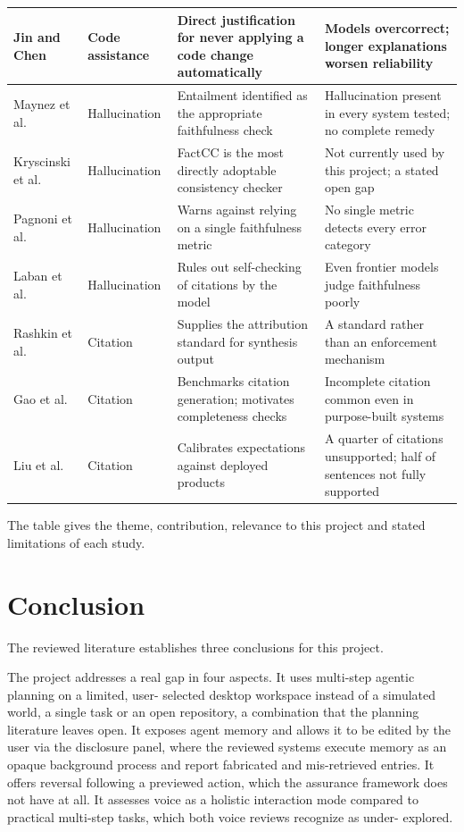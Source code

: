 \documentclass{FastFyp}
\begin{document}
{\begin{longtable}{|p{2.6cm}|p{2.0cm}|p{3.6cm}|p{4.6cm}|}
\hline
Jin and Chen \cite{ref:jin2026} & Code assistance & Direct justification for never applying a code change automatically & Models overcorrect; longer explanations worsen reliability \\
\hline
Maynez et al. \cite{ref:maynez2020} & Hallucination & Entailment identified as the appropriate faithfulness check & Hallucination present in every system tested; no complete remedy \\
\hline
Kryscinski et al. \cite{ref:kryscinski2020} & Hallucination & FactCC is the most directly adoptable consistency checker & Not currently used by this project; a stated open gap \\
\hline
Pagnoni et al. \cite{ref:pagnoni2021} & Hallucination & Warns against relying on a single faithfulness metric & No single metric detects every error category \\
\hline
Laban et al. \cite{ref:laban2023} & Hallucination & Rules out self-checking of citations by the model & Even frontier models judge faithfulness poorly \\
\hline
Rashkin et al. \cite{ref:rashkin2023} & Citation & Supplies the attribution standard for synthesis output & A standard rather than an enforcement mechanism \\
\hline
Gao et al. \cite{ref:gao2023} & Citation & Benchmarks citation generation; motivates completeness checks & Incomplete citation common even in purpose-built systems \\
\hline
Liu et al. \cite{ref:liu2023} & Citation & Calibrates expectations against deployed products & A quarter of citations unsupported; half of sentences not fully supported \\
\hline
\end{longtable}
}

The table gives the theme, contribution, relevance to this project and stated limitations of each study.

\section{Conclusion}
The reviewed literature establishes three conclusions for this project.

The project addresses a real gap in four aspects. It uses multi-step agentic planning on a limited, user- selected desktop workspace instead of a simulated world, a single task or an open repository, a combination that the planning literature leaves open. It exposes agent memory and allows it to be edited by the user via the disclosure panel, where the reviewed systems execute memory as an opaque background process and report fabricated and mis-retrieved entries. It offers reversal following a previewed action, which the assurance framework does not have at all. It assesses voice as a holistic interaction mode compared to practical multi-step tasks, which both voice reviews recognize as under- explored.
\end{document}
